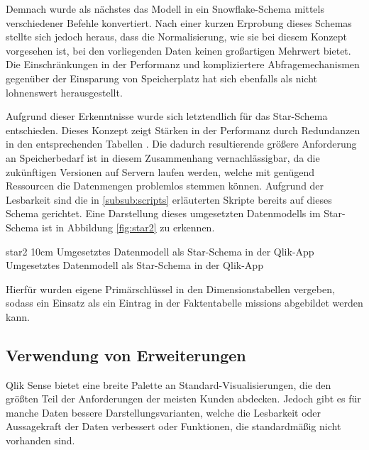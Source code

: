 
Demnach wurde als nächstes das Modell in ein Snowflake-Schema mittels verschiedener Befehle konvertiert. 
Nach einer kurzen Erprobung dieses Schemas stellte sich jedoch heraus, dass die Normalisierung, wie sie bei diesem Konzept vorgesehen ist, bei den vorliegenden Daten keinen großartigen Mehrwert bietet.
Die Einschränkungen in der Performanz und kompliziertere Abfragemechanismen gegenüber der Einsparung von Speicherplatz hat sich ebenfalls als nicht lohnenswert herausgestellt.

Aufgrund dieser Erkenntnisse wurde sich letztendlich für das Star-Schema entschieden.
Dieses Konzept zeigt Stärken in der Performanz durch Redundanzen in den entsprechenden Tabellen \cite[6.1]{Bauer.2004}. 
Die dadurch resultierende größere Anforderung an Speicherbedarf ist in diesem Zusammenhang vernachlässigbar, da die zukünftigen Versionen auf Servern laufen werden, welche mit genügend Ressourcen die Datenmengen problemlos stemmen können.
Aufgrund der Lesbarkeit sind die in \ref{subsub:scripts} erläuterten Skripte bereits auf dieses Schema gerichtet. 
Eine Darstellung dieses umgesetzten Datenmodells im Star-Schema ist in Abbildung \ref{fig:star2} zu erkennen.

\bild
{star2}
{10cm}
{Umgesetztes Datenmodell als Star-Schema in der Qlik-App}
{Umgesetztes Datenmodell als Star-Schema in der Qlik-App}

Hierfür wurden eigene Primärschlüssel in den Dimensionstabellen vergeben, sodass ein Einsatz als ein Eintrag in der Faktentabelle \glqq missions\grqq{} abgebildet werden kann.

\subsection{Verwendung von Erweiterungen}
\label{sub:extension}
Qlik Sense bietet eine breite Palette an Standard-Visualisierungen, die den größten Teil der Anforderungen der meisten Kunden abdecken.
Jedoch gibt es für manche Daten bessere Darstellungsvarianten, welche die Lesbarkeit oder Aussagekraft der Daten verbessert oder Funktionen, die standardmäßig nicht vorhanden sind.

